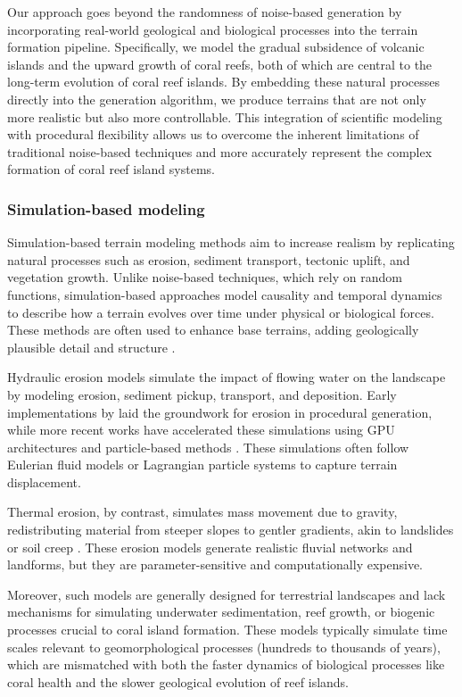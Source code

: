 Our approach goes beyond the randomness of noise-based generation by incorporating real-world geological and biological processes into the terrain formation pipeline. Specifically, we model the gradual subsidence of volcanic islands and the upward growth of coral reefs, both of which are central to the long-term evolution of coral reef islands. By embedding these natural processes directly into the generation algorithm, we produce terrains that are not only more realistic but also more controllable. This integration of scientific modeling with procedural flexibility allows us to overcome the inherent limitations of traditional noise-based techniques and more accurately represent the complex formation of coral reef island systems.

\subsubsection{Simulation-based modeling}

Simulation-based terrain modeling methods aim to increase realism by replicating natural processes such as erosion, sediment transport, tectonic uplift, and vegetation growth. Unlike noise-based techniques, which rely on random functions, simulation-based approaches model causality and temporal dynamics to describe how a terrain evolves over time under physical or biological forces. These methods are often used to enhance base terrains, adding geologically plausible detail and structure \cite{Benes2006, Smelik2009}.


Hydraulic erosion models simulate the impact of flowing water on the landscape by modeling erosion, sediment pickup, transport, and deposition. Early implementations by \cite{Musgrave1989} laid the groundwork for erosion in procedural generation, while more recent works have accelerated these simulations using GPU architectures \cite{Mei2007} and particle-based methods \cite{Neidhold2005}. These simulations often follow Eulerian fluid models or Lagrangian particle systems to capture terrain displacement.

Thermal erosion, by contrast, simulates mass movement due to gravity, redistributing material from steeper slopes to gentler gradients, akin to landslides or soil creep \cite{Benes2006}. These erosion models generate realistic fluvial networks and landforms, but they are parameter-sensitive and computationally expensive.

Moreover, such models are generally designed for terrestrial landscapes and lack mechanisms for simulating underwater sedimentation, reef growth, or biogenic processes crucial to coral island formation. These models typically simulate time scales relevant to geomorphological processes (hundreds to thousands of years), which are mismatched with both the faster dynamics of biological processes like coral health and the slower geological evolution of reef islands.

